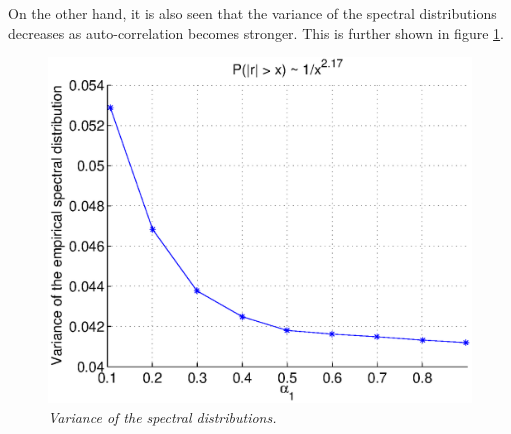 \documentclass{article}
\begin{document}
On the other hand, it is also seen that the variance of the spectral
distributions decreases as auto-correlation becomes stronger. This is
further shown in figure \ref{fig:spectral_dist3}.
\begin{figure}[htb!]
  \centering
  \includegraphics[scale=0.5]{../pics/spectral_dist3.eps}
  \caption{\small \it Variance of the spectral distributions.}
  \label{fig:spectral_dist3}
\end{figure}
\end{document}
